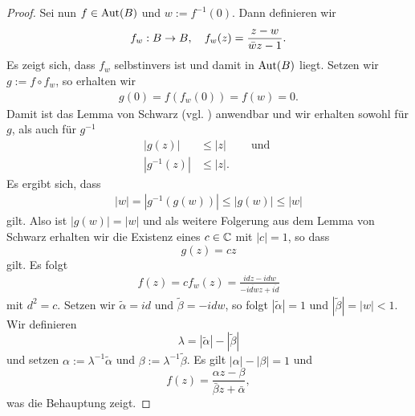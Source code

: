 \begin{proof}
  Sei nun $f \in \operatorname{Aut}(B)$ und $w := f^{-1}(0)$. Dann definieren wir
  \[
  f_w : B \rightarrow B, \quad f_w(z) = \frac{z -w}{\bar w z - 1}.
  \]
  Es zeigt sich, dass $f_w$ selbstinvers ist und damit in $\operatorname{Aut}(B)$
  liegt. Setzen wir $g := f\circ f_w$, so erhalten wir
  \begin{align*}
    g(0) = f( f_w(0)) = f(w) = 0.
  \end{align*}
  Damit ist das Lemma von Schwarz (vgl. \cite[Satz 5.10]{Kas})
  anwendbar und wir erhalten sowohl für $g$, als auch für $g^{-1}$
  \begin{align*}
    |g(z)| & \leq |z| && \text{ und } \\
    |g^{-1}(z)| & \leq |z|.
  \end{align*}
  Es ergibt sich, dass
  \begin{align*}
    |w| = |g^{-1}(g(w))| \leq |g(w)| \leq |w|
  \end{align*}
  gilt. Also ist $|g(w)| = |w|$ und als weitere Folgerung aus dem Lemma
  von Schwarz erhalten wir die Existenz eines $c \in \mathbb{C}$ mit $|c| =
  1$, so dass
  \[
  g(z) = cz
  \]
  gilt. Es folgt
  \begin{align*}
    f(z) = c f_w(z) = \frac{i dz - i dw}{ - \overline{idw} z +
      \overline{i d}}
  \end{align*}
  mit $d^2 = c$. Setzen wir $\tilde \alpha = i d$ und $\tilde
  \beta = - i d w$, so folgt $|\tilde \alpha| = 1$ und $|\tilde \beta|
  = |w| < 1$. Wir definieren
  \[
  \lambda = |\tilde \alpha| - |\tilde \beta|
  \]
  und setzen $\alpha := \lambda^{-1} \tilde \alpha$ und $\beta :=
  \lambda^{-1} \tilde \beta$. Es gilt $|\alpha| - |\beta| = 1$ und
  \[
  f(z) = \frac{\alpha z - \beta}{\bar \beta z  + \bar \alpha},
  \]
  was die Behauptung zeigt.


\end{proof}
